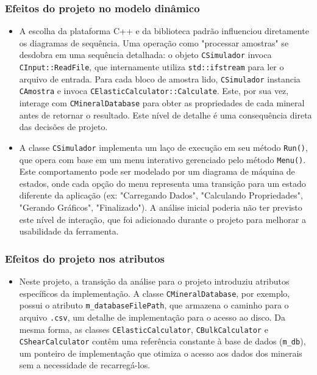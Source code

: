 \subsubsection*{Efeitos do projeto no modelo dinâmico}
\begin{itemize}
    \item A escolha da plataforma C++ e da biblioteca padrão influenciou diretamente os diagramas de sequência. Uma operação como "processar amostras" se desdobra em uma sequência detalhada: o objeto \texttt{CSimulador} invoca \texttt{CInput::ReadFile}, que internamente utiliza \texttt{std::ifstream} para ler o arquivo de entrada. Para cada bloco de amostra lido, \texttt{CSimulador} instancia \texttt{CAmostra} e invoca \texttt{CElasticCalculator::Calculate}. Este, por sua vez, interage com \texttt{CMineralDatabase} para obter as propriedades de cada mineral antes de retornar o resultado. Este nível de detalhe é uma consequência direta das decisões de projeto.

    \item A classe \texttt{CSimulador} implementa um laço de execução em seu método \texttt{Run()}, que opera com base em um menu interativo gerenciado pelo método \texttt{Menu()}. Este comportamento pode ser modelado por um diagrama de máquina de estados, onde cada opção do menu representa uma transição para um estado diferente da aplicação (ex: "Carregando Dados", "Calculando Propriedades", "Gerando Gráficos", "Finalizado"). A análise inicial poderia não ter previsto este nível de interação, que foi adicionado durante o projeto para melhorar a usabilidade da ferramenta.
\end{itemize}

\subsubsection*{Efeitos do projeto nos atributos}
\begin{itemize}
    \item Neste projeto, a transição da análise para o projeto introduziu atributos específicos da implementação. A classe \texttt{CMineralDatabase}, por exemplo, possui o atributo \texttt{m\_databaseFilePath}, que armazena o caminho para o arquivo \texttt{.csv}, um detalhe de implementação para o acesso ao disco. Da mesma forma, as classes \texttt{CElasticCalculator}, \texttt{CBulkCalculator} e \texttt{CShearCalculator} contêm uma referência constante à base de dados (\texttt{m\_db}), um ponteiro de implementação que otimiza o acesso aos dados dos minerais sem a necessidade de recarregá-los.
\end{itemize}

